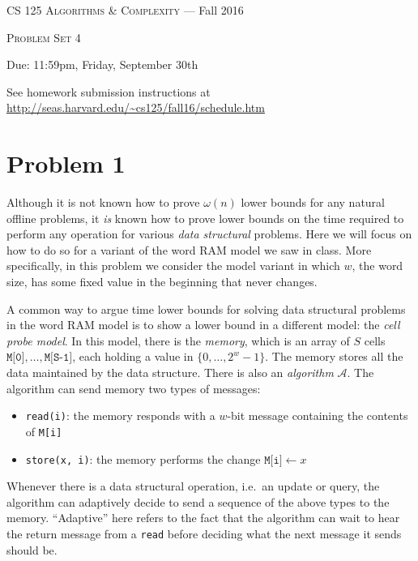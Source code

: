 \documentclass[12pt]{article}
\begin{document}
\thispagestyle{empty}

\begin{center}
{\Large \textsc{CS 125 Algorithms \& Complexity} --- Fall 2016}

\bigskip

{\Large \textsc{Problem Set 4}}

\smallskip

Due: 11:59pm, Friday, September 30th

\bigskip

{\footnotesize See homework submission instructions at \url{http://seas.harvard.edu/~cs125/fall16/schedule.htm}}
\end{center}

\section*{Problem 1} 

Although it is not known how to prove $\omega(n)$ lower bounds for any natural offline problems, it {\em is} known how to prove lower bounds on the time required to perform any operation for various {\em data structural} problems. Here we will focus on how to do so for a variant of the word RAM model we saw in class. More specifically, in this problem we consider the model variant in which $w$, the word size, has some fixed value in the beginning that never changes.

A common way to argue time lower bounds for solving data structural problems in the word RAM model is to show a lower bound in a different model: the {\em cell probe model}. In this model, there is the {\em memory}, which is an array of $S$ cells $\texttt{M[0]},\ldots,\texttt{M[S-1]}$, each holding a value in $\{0,\ldots,2^w - 1\}$. The memory stores all the data maintained by the data structure. There is also an {\em algorithm} $\mathcal{A}$. The algorithm can send memory two types of messages:
\begin{itemize}
\item \texttt{read(i)}: the memory responds with a $w$-bit message containing the contents of \texttt{M[i]}
\item \texttt{store(x, i)}: the memory performs the change $\texttt{M[i]}\leftarrow x$
\end{itemize}
Whenever there is a data structural operation, i.e.\ an update or query, the algorithm can adaptively decide to send a sequence of the above types to the memory. ``Adaptive'' here refers to the fact that the algorithm can wait to hear the return message from a \texttt{read} before deciding what the next message it sends should be.
\end{document}
